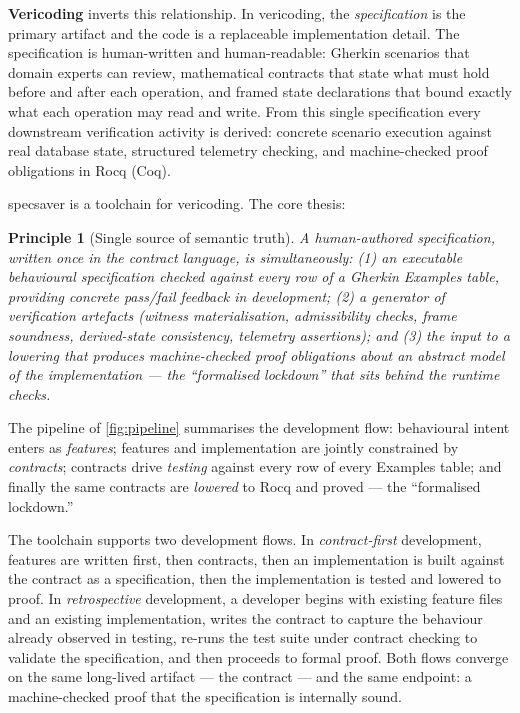 \documentclass[11pt,a4paper]{article}
\newtheorem{principle}{Principle}
\begin{document}
\textbf{Vericoding} inverts this relationship.  In vericoding, the
\emph{specification} is the primary artifact and the code is a
replaceable implementation detail.  The specification is human-written
and human-readable: Gherkin scenarios that domain experts can review,
mathematical contracts that state what must hold before and after each
operation, and framed state declarations that bound exactly what each
operation may read and write.  From this single specification every
downstream verification activity is derived: concrete scenario
execution against real database state, structured telemetry checking,
and machine-checked proof obligations in Rocq (Coq).

\textsf{specsaver} is a toolchain for vericoding.  The core thesis:

\begin{principle}[Single source of semantic truth]
A human-authored specification, written once in the contract
language, is simultaneously: (1) an executable behavioural
specification checked against every row of a Gherkin Examples table,
providing concrete pass/fail feedback in development; (2) a generator
of verification artefacts (witness materialisation, admissibility
checks, frame soundness, derived-state consistency, telemetry
assertions); and (3) the input to a lowering that produces
machine-checked proof obligations about an abstract model of the
implementation --- the ``formalised lockdown'' that sits behind the
runtime checks.
\end{principle}

The pipeline of \cref{fig:pipeline} summarises the development flow:
behavioural intent enters as \emph{features}; features and
implementation are jointly constrained by \emph{contracts}; contracts
drive \emph{testing} against every row of every Examples table; and
finally the same contracts are \emph{lowered} to Rocq and proved ---
the ``formalised lockdown.''

The toolchain supports two development flows.  In
\emph{contract-first} development, features are written first, then
contracts, then an implementation is built against the contract as a
specification, then the implementation is tested and lowered to proof.
In \emph{retrospective} development, a developer begins with existing
feature files and an existing implementation, writes the contract to
capture the behaviour already observed in testing, re-runs the test
suite under contract checking to validate the specification, and then
proceeds to formal proof.  Both flows converge on the same long-lived
artifact --- the contract --- and the same endpoint: a machine-checked
proof that the specification is internally sound.
\end{document}
